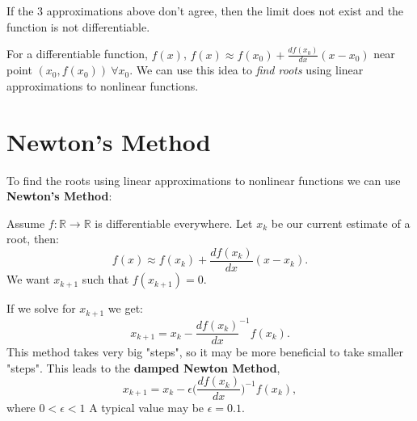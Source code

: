 \newpage

\begin{remark}
	If the 3 approximations above don't agree, then the limit does not exist and the function is not differentiable.
\end{remark}

For a differentiable function, \(f(x)\), \(f(x) \approx f(x_0) + \frac{df(x_0)}{dx} (x - x_0)	\) near point \((x_0, f(x_0)) \: \forall x_0 \). We can use this idea to \emph{find roots} using linear approximations to nonlinear functions.

\section{Newton's Method}
To find the roots using linear approximations to nonlinear functions we can use \textbf{Newton's Method}:

\begin{definition}
	Assume \(f: \mathbb{R} \to \mathbb{R} \) is differentiable everywhere. Let \(x_k\) be our current estimate of a root, then: \[f(x) \approx f(x_k) + \frac{df(x_k)}{dx} (x - x_k).\] We want \(x_{k + 1}\) such that \(f(x_{k + 1}) = 0\).
\end{definition}
If we solve for \(x_{k + 1}\) we get: \[ x_{k + 1} = x_k - \frac{df(x_k)}{dx}^{-1} f(x_k). \] This method takes very big "steps", so it may be more beneficial to take smaller "steps". This leads to the \textbf{damped Newton Method},
\[
	x_{k+1} = x_k - \epsilon \big ( \frac{df(x_k)}{dx} \big )^{-1} f(x_k),
\]
where \(0 < \epsilon < 1\) A typical value may be \(\epsilon = 0.1\).